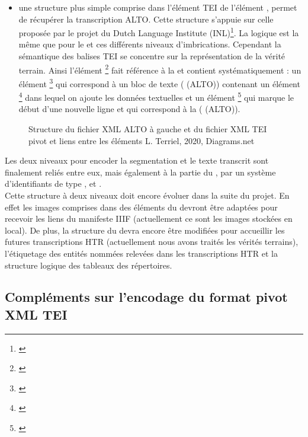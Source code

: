 \begin{itemize}
    \item une structure plus simple comprise dans l'élément TEI  de l'élément , permet de récupérer la transcription ALTO. Cette structure s'appuie sur celle proposée par le projet du Dutch Language Institute (INL)\footnote{\cite{dutch_language_institute_alto2tei_nodate}}. La logique est la même que pour le  et ces différents niveaux d'imbrications. Cependant la sémantique des balises TEI se concentre sur la représentation de la vérité terrain. Ainsi l'élément \footnote{\cite{tei_tei_nodate-11}} fait référence à la  et contient systématiquement : un élément \footnote{\cite{tei_tei_nodate-10}} qui correspond à un bloc de texte ( (ALTO)) contenant un élément \footnote{\cite{tei_tei_nodate-24}} dans lequel on ajoute les données textuelles et un élément \footnote{\cite{tei_tei_nodate-25}} qui marque le début d'une nouvelle ligne et qui correspond à la ( (ALTO)).
\end{itemize}

\begin{figure}[h!]
    \centering
    \centerline{}
    \caption{Structure du fichier XML ALTO à gauche et du fichier XML TEI pivot et liens entre les éléments \textcopyright L. Terriel, 2020, Diagrams.net}
    \label{fig:structure_arbre_tei_alto}
\end{figure}
\newpage
Les deux niveaux pour encoder la segmentation et le texte transcrit sont finalement reliés entre eux, mais également à la partie du , par un système d'identifiants de type ,  et .\\

Cette structure à deux niveaux doit encore évoluer dans la suite du projet. En effet les images comprises dans des éléments  du  devront être adaptées pour recevoir les liens du manifeste IIIF (actuellement ce sont les images stockées en local). De plus, la structure du  devra encore être modifiées pour accueillir les futures transcriptions HTR (actuellement nous avons traités les vérités terrains), l'étiquetage des entités nommées relevées dans les transcriptions HTR et la structure logique des tableaux des répertoires.
\newpage
\subsection{Compléments sur l'encodage du format pivot XML TEI}

